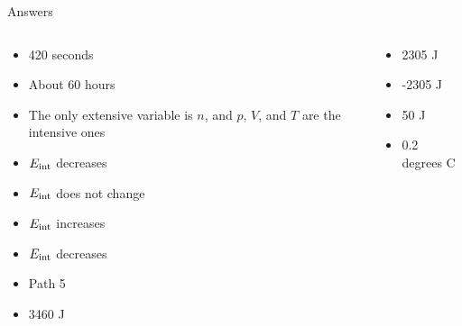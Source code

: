 \documentclass{beamer}
\begin{document}
\begin{frame}{Answers}
\small
\begin{columns}[T]
\begin{column}{0.5\textwidth}
\begin{itemize}
\item 420 seconds
\item About 60 hours
\item The only extensive variable is $n$, and $p$, $V$, and $T$ are the intensive ones
\item $E_{\rm int}$ decreases
\item $E_{\rm int}$ does not change
\item $E_{\rm int}$ increases
\item $E_{\rm int}$ decreases
\item Path 5
\item 3460 J
\end{itemize}
\end{column}
\begin{column}{0.5\textwidth}
\begin{itemize}
\item 2305 J
\item -2305 J
\item 50 J
\item 0.2 degrees C
\end{itemize}
\end{column}
\end{columns}
\end{frame}
\end{document}
